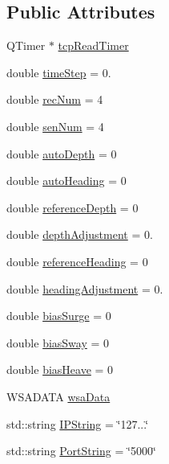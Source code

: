 \subsection*{Public Attributes}
\begin{DoxyCompactItemize}
\item 
Q\+Timer $\ast$ \mbox{\hyperlink{class_tcp_rov_a5f2826f79ed62895875293b721006d8b}{tcp\+Read\+Timer}}
\item 
double \mbox{\hyperlink{class_tcp_rov_a1ccf9c057aaf27f87224a67344dc8825}{time\+Step}} = 0.
\item 
double \mbox{\hyperlink{class_tcp_rov_ae2e3f9074a6405d705d8336415324a75}{rec\+Num}} = 4
\item 
double \mbox{\hyperlink{class_tcp_rov_a9594e6e9fe74b9bf95be073feaa64015}{sen\+Num}} = 4
\item 
double \mbox{\hyperlink{class_tcp_rov_a9b3e9d308a427b0937d90950ba9ca25e}{auto\+Depth}} = 0
\item 
double \mbox{\hyperlink{class_tcp_rov_a8bc150b95d69205e3c545e3726f226bc}{auto\+Heading}} = 0
\item 
double \mbox{\hyperlink{class_tcp_rov_acf58b81ceb82a5b655647b5ba78cc7bd}{reference\+Depth}} = 0
\item 
double \mbox{\hyperlink{class_tcp_rov_a55d424e0f7a4c738f1348d97d5c2e71a}{depth\+Adjustment}} = 0.
\item 
double \mbox{\hyperlink{class_tcp_rov_a53508d2f83d7fba9c1e072de9dac7f39}{reference\+Heading}} = 0
\item 
double \mbox{\hyperlink{class_tcp_rov_a07d5e3b9d0cf49ab7b7b174e918549b5}{heading\+Adjustment}} = 0.
\item 
double \mbox{\hyperlink{class_tcp_rov_a9875854cdb7b726f1f744485f5b76e08}{bias\+Surge}} = 0
\item 
double \mbox{\hyperlink{class_tcp_rov_a01b97d8650e6430ceed310d8f50f1346}{bias\+Sway}} = 0
\item 
double \mbox{\hyperlink{class_tcp_rov_a8eb195041c3815a585fa0eb8667d272a}{bias\+Heave}} = 0
\item 
W\+S\+A\+D\+A\+TA \mbox{\hyperlink{class_tcp_rov_a922d1ddb18d544533c4579a04418fd9d}{wsa\+Data}}
\item 
std\+::string \mbox{\hyperlink{class_tcp_rov_a41cacbf5c086d1f3b3ea1fcf988ad899}{I\+P\+String}} = \char`\"{}127...\char`\"{}
\item 
std\+::string \mbox{\hyperlink{class_tcp_rov_afcefad95ed292c95e0793ad4ff06afdd}{Port\+String}} = \char`\"{}5000\char`\"{}
\item 

\end{DoxyCompactItemize}
